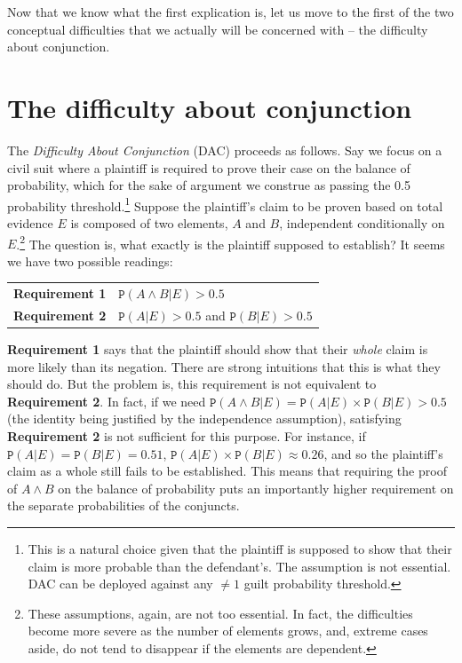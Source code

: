 \documentclass{ifcolog}
\newcommand{\pr}[1]{\mbox{$\mathtt{P}(#1)$}}
\newcommand{\et}{\wedge}
\begin{document}
Now that we know what the first explication is, let us move to the first of the two conceptual difficulties that we actually will be concerned with -- the difficulty about conjunction.





\section{The difficulty about conjunction}\label{sec:diff_conjunction}


 The \emph{Difficulty About Conjunction} (DAC) proceeds as follows. Say we focus on a civil suit where a plaintiff is required to prove  their case on the balance of probability, which for the sake of argument we construe as passing the 0.5 probability threshold.\footnote{This is a natural choice given that the plaintiff is supposed to show that their claim is more probable than the defendant's. The assumption is not essential. DAC can be deployed against any $\neq 1$ guilt probability threshold.} Suppose the plaintiff's claim to be proven based on total evidence $E$ is composed of two elements, $A$ and $B$, independent conditionally on $E$.\footnote{These assumptions, again, are not  too essential. In fact, the difficulties become more severe as the number of elements grows, and, extreme cases aside, do not tend to disappear if the elements are dependent.} The question is, what exactly is the plaintiff supposed to establish? It seems we have two possible readings:



\begin{center}
\begin{tabular}
{@{}ll@{}}
\toprule
\textbf{Requirement 1}  &    $\pr{A\et B\vert E}>0.5$ \\ 
\textbf{Requirement 2} &    $\pr{A\vert E}>0.5$ and $\pr{B\vert E}>0.5$\\   
\bottomrule
\end{tabular}
\end{center}

\textbf{Requirement 1} says that the plaintiff should show that their \emph{whole} claim is more likely than its negation. There are strong intuitions that this is what they should do. But the problem is, this requirement is not equivalent to \textbf{Requirement 2}. In fact, if we need  $\pr{A\et B\vert E}=\pr{A\vert E}\times\pr{B\vert E}>0.5$ (the identity being justified by the independence assumption), satisfying \textbf{Requirement 2} is not sufficient for this purpose. For instance, if $\pr{A\vert E}=\pr{B\vert E}=0.51$, $\pr{A\vert E}\times \pr{B\vert E}\approx 0.26$, and so the plaintiff's claim as a whole still fails to be established. This means that requiring the proof of $A\et B$ on the balance of probability puts an importantly higher requirement on the separate probabilities of the conjuncts. 
\end{document}
